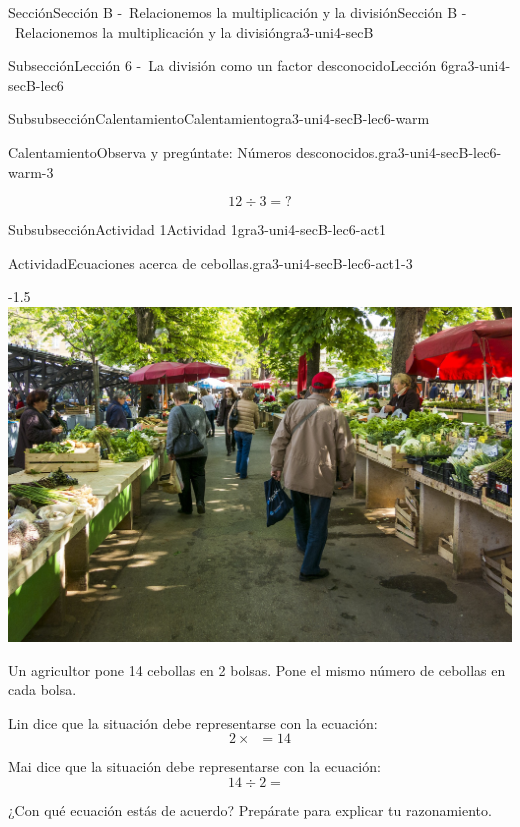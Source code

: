 \documentclass[twoside,10pt,]{article}
\begin{document}
\begin{sectionptx}{Sección}{Sección B -~Relacionemos la multiplicación y la división}{}{Sección B -~Relacionemos la multiplicación y la división}{}{}{gra3-uni4-secB}
\begin{subsectionptx}{Subsección}{Lección 6 -~La división como un factor desconocido}{}{Lección 6}{}{}{gra3-uni4-secB-lec6}
\begin{subsubsectionptx}{Subsubsección}{Calentamiento}{}{Calentamiento}{}{}{gra3-uni4-secB-lec6-warm}
\begin{exploration}{Calentamiento}{Observa y pregúntate: Números desconocidos.}{gra3-uni4-secB-lec6-warm-3}
\begin{sidebyside}{2}{0}{0}{0}
\begin{sbspanel}{0.5}
%
\begin{equation*}
12\div 3 ={?}
\end{equation*}
%
\end{sbspanel}%
\end{sidebyside}%
\end{exploration}%
\end{subsubsectionptx}
%
%
\typeout{************************************************}
\typeout{************************************************}
%
\begin{subsubsectionptx}{Subsubsección}{Actividad 1}{}{Actividad 1}{}{}{gra3-uni4-secB-lec6-act1}
\begin{activity}{Actividad}{Ecuaciones acerca de cebollas.}{gra3-uni4-secB-lec6-act1-3}%
\begin{image}{0.15}{0.7}{0.15}{-1.5\baselineskip}%
\includegraphics[width=\linewidth]{external/jpg-source/3.4.B6 Act 1 Launch.jpg}
\end{image}%
Un agricultor pone 14 cebollas en 2 bolsas. Pone el mismo número de cebollas en cada bolsa.%
\par
Lin dice que la situación debe representarse con la ecuación:%
\begin{equation*}
2 \times \boxed{\phantom{3}} = 14
\end{equation*}
%
\par
Mai dice que la situación debe representarse con la ecuación:%
\begin{equation*}
14 \div 2 = \boxed{\phantom{3}}
\end{equation*}
%
\par
¿Con qué ecuación estás de acuerdo? Prepárate para explicar tu razonamiento.%
\end{activity}%

\end{subsubsectionptx}
\end{subsectionptx}
\end{sectionptx}
\end{document}
